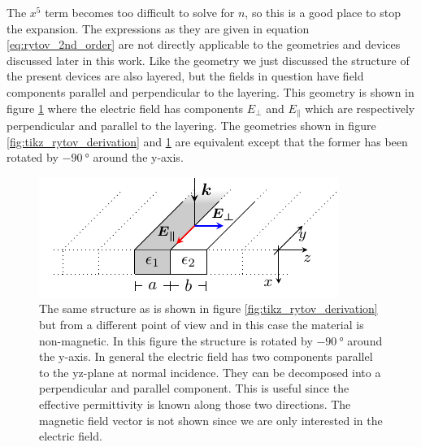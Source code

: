 The $x^5$ term becomes too difficult to solve for $n$, so this is a good place to stop the expansion. The expressions as they are given in equation \ref{eq:rytov_2nd_order} are not directly applicable to the geometries and devices discussed later in this work. Like the geometry we just discussed the structure of the present devices are also layered, but the fields in question have field components parallel and perpendicular to the layering. This geometry is shown in figure \ref{fig:stratified_structure} where the electric field has components $E_{\bot}$ and $E_{\parallel}$ which are respectively perpendicular and parallel to the layering. The geometries shown in figure \ref{fig:tikz_rytov_derivation} and \ref{fig:stratified_structure} are equivalent except that the former has been rotated by $\SI{-90}{\degree}$ around the y-axis. 

\begin{figure}[h]
    \centering
    \includegraphics[scale=2]{images/theory/tikz_stratified_structure.pdf}
    \caption{The same structure as is shown in figure \ref{fig:tikz_rytov_derivation} but from a different point of view and in this case the material is non-magnetic. In this figure the structure is rotated by $\SI{-90}{\degree}$ around the y-axis. In general the electric field has two components parallel to the yz-plane at normal incidence. They can be decomposed into a perpendicular and parallel component. This is useful since the effective permittivity is known along those two directions. The magnetic field vector is not shown since we are only interested in the electric field.}
    \label{fig:stratified_structure}
\end{figure}

